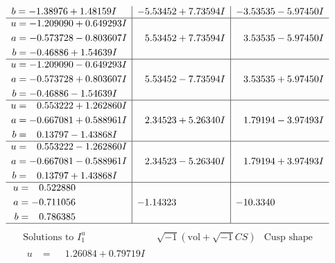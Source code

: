 \documentclass[1p]{elsarticle_modified}
\theoremstyle{definition}
\newcommand{\I}{\sqrt{-1}}
\begin{document}
$$\begin{array}{c|c|c}
\begin{aligned}
b &= -1.38976 + 1.48159 I\end{aligned}
 & -5.53452 + 7.73594 I & -3.53535 - 5.97450 I \\ \hline\begin{aligned}
u &= -1.209090 + 0.649293 I \\
a &= -0.573728 - 0.803607 I \\
b &= -0.46886 + 1.54639 I\end{aligned}
 & \phantom{-}5.53452 + 7.73594 I & \phantom{-}3.53535 - 5.97450 I \\ \hline\begin{aligned}
u &= -1.209090 - 0.649293 I \\
a &= -0.573728 + 0.803607 I \\
b &= -0.46886 - 1.54639 I\end{aligned}
 & \phantom{-}5.53452 - 7.73594 I & \phantom{-}3.53535 + 5.97450 I \\ \hline\begin{aligned}
u &= \phantom{-}0.553222 + 1.262860 I \\
a &= -0.667081 + 0.588961 I \\
b &= \phantom{-}0.13797 - 1.43868 I\end{aligned}
 & \phantom{-}2.34523 + 5.26340 I & \phantom{-}1.79194 - 3.97493 I \\ \hline\begin{aligned}
u &= \phantom{-}0.553222 - 1.262860 I \\
a &= -0.667081 - 0.588961 I \\
b &= \phantom{-}0.13797 + 1.43868 I\end{aligned}
 & \phantom{-}2.34523 - 5.26340 I & \phantom{-}1.79194 + 3.97493 I \\ \hline\begin{aligned}
u &= \phantom{-}0.522880\phantom{ +0.000000I} \\
a &= -0.711056\phantom{ +0.000000I} \\
b &= \phantom{-}0.786385\phantom{ +0.000000I}\end{aligned}
 & -1.14323\phantom{ +0.000000I} & -10.3340\phantom{ +0.000000I}\\
 \hline 
 \end{array}$$\newpage$$\begin{array}{c|c|c}  
\text{Solutions to }I^u_{1}& \I (\text{vol} + \sqrt{-1}CS) & \text{Cusp shape}\\
 \hline 
\begin{aligned}
u &= \phantom{-}1.26084 + 0.79719 I \\

\end{aligned}
\end{array}$$
\end{document}
